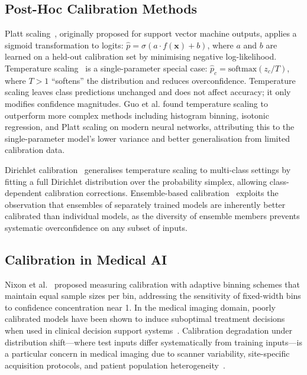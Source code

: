 \subsection{Post-Hoc Calibration Methods}

Platt scaling~\cite{platt1999probabilistic}, originally proposed for support vector machine outputs, applies a sigmoid transformation to logits: $\hat{p} = \sigma(a \cdot f(\mathbf{x}) + b)$, where $a$ and $b$ are learned on a held-out calibration set by minimising negative log-likelihood. Temperature scaling~\cite{guo2017calibration} is a single-parameter special case: $\hat{p}_c = \text{softmax}(z_c / T)$, where $T > 1$ ``softens'' the distribution and reduces overconfidence. Temperature scaling leaves class predictions unchanged and does not affect accuracy; it only modifies confidence magnitudes. Guo et al. found temperature scaling to outperform more complex methods including histogram binning, isotonic regression, and Platt scaling on modern neural networks, attributing this to the single-parameter model's lower variance and better generalisation from limited calibration data.

Dirichlet calibration~\cite{kull2019beyond} generalises temperature scaling to multi-class settings by fitting a full Dirichlet distribution over the probability simplex, allowing class-dependent calibration corrections. Ensemble-based calibration~\cite{lakshminarayanan2017simple} exploits the observation that ensembles of separately trained models are inherently better calibrated than individual models, as the diversity of ensemble members prevents systematic overconfidence on any subset of inputs.

\subsection{Calibration in Medical AI}

Nixon et al.~\cite{nixon2019measuring} proposed measuring calibration with adaptive binning schemes that maintain equal sample sizes per bin, addressing the sensitivity of fixed-width bins to confidence concentration near 1. In the medical imaging domain, poorly calibrated models have been shown to induce suboptimal treatment decisions when used in clinical decision support systems~\cite{jiang2012calibrating}. Calibration degradation under distribution shift—where test inputs differ systematically from training inputs—is a particular concern in medical imaging due to scanner variability, site-specific acquisition protocols, and patient population heterogeneity~\cite{ovadia2019can}.

